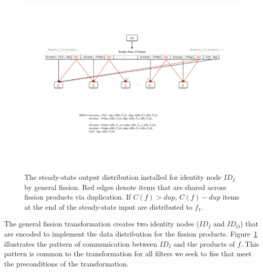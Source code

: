 \begin{figure}
\centering
\includegraphics[width=\textwidth]{figures/split-pattern.pdf}
\caption[The output distribution required for general
fission.]{
The steady-state output distribution installed for identity node
$ID_I$ by general fission.  Red edges denote items that are shared
across fission products via duplication. If $C(f) > dup$, $C(f) - dup$ items at the end of the
steady-state input are distributed to $f_1$. \label{fig:split-pattern}}
\end{figure}

The general fission transformation creates two identity nodes ($ID_I$
and $ID_O$) that are encoded to implement the data distribution for
the fission products.  Figure~\ref{fig:split-pattern} illustrates
the pattern of communication between $ID_I$ and the products of $f$.
This pattern is common to the transformation for all filters we seek
to fiss that meet the preconditions of the transformation.

